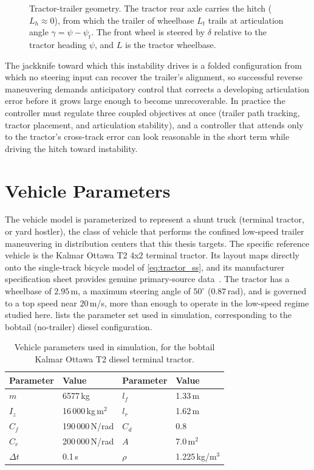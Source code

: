 \begin{figure}[t]
  \centering
  
  \caption{Tractor-trailer geometry. The tractor rear axle carries the hitch ($L_h \approx 0$), from which the trailer of wheelbase $L_t$ trails at articulation angle $\gamma = \psi - \psi_t$. The front wheel is steered by $\delta$ relative to the tractor heading $\psi$, and $L$ is the tractor wheelbase.}
  \label{fig:tractor_trailer_geometry}
\end{figure}



The jackknife toward which this instability drives is a folded configuration from which no steering input can recover the trailer's alignment, so successful reverse maneuvering demands anticipatory control that corrects a developing articulation error before it grows large enough to become unrecoverable. In practice the controller must regulate three coupled objectives at once (trailer path tracking, tractor placement, and articulation stability), and a controller that attends only to the tractor's cross-track error can look reasonable in the short term while driving the hitch toward instability.

\section{Vehicle Parameters}
\label{sec:vehicle_params}

The vehicle model is parameterized to represent a shunt truck (terminal tractor, or yard hostler), the class of vehicle that performs the confined low-speed trailer maneuvering in distribution centers that this thesis targets. The specific reference vehicle is the Kalmar Ottawa T2 4x2 terminal tractor. Its layout maps directly onto the single-track bicycle model of \cref{eq:tractor_ss}, and its manufacturer specification sheet provides genuine primary-source data~\cite{kalmar2022ottawa}. The tractor has a wheelbase of $2.95$\,m, a maximum steering angle of $50^\circ$ ($0.87$\,rad), and is governed to a top speed near $20$\,m/s, more than enough to operate in the low-speed regime studied here.  lists the parameter set used in simulation, corresponding to the bobtail (no-trailer) diesel configuration.

\begin{table}[H]
\centering
\caption{Vehicle parameters used in simulation, for the bobtail Kalmar Ottawa T2 diesel terminal tractor.}
\label{tab:vehicle_params}
\begin{tabular}{llll}
\toprule
Parameter & Value & Parameter & Value \\
\midrule
$m$ & 6577\,kg & $l_f$ & 1.33\,m \\
$I_z$ & 16\,000\,kg\,m$^2$ & $l_r$ & 1.62\,m \\
$C_f$ & 190\,000\,N/rad & $C_d$ & 0.8 \\
$C_r$ & 200\,000\,N/rad & $A$ & 7.0\,m$^2$ \\
$\Delta t$ & 0.1\,s & $\rho$ & 1.225\,kg/m$^3$ \\
\bottomrule
\end{tabular}
\end{table}

